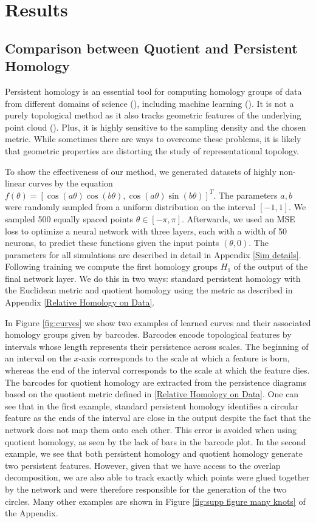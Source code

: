 \documentclass[10pt]{article} %
\theoremstyle{plain}
\theoremstyle{definition}
\theoremstyle{remark}
\begin{document}
\section{Results}
\subsection{Comparison between Quotient and Persistent Homology} 

Persistent homology is an essential tool for computing homology groups of data from different domains of science (\cite{carlsson2009topology, wasserman2018topological}), including machine learning (\cite{papamarkou2024position}). It is not a purely topological method as it also tracks geometric features of the underlying point cloud (\cite{bubenik2020persistent, turkes2022effectiveness}). Plus, it is highly sensitive to the sampling density and the chosen metric. While sometimes there are ways to overcome these problems, it is likely that geometric properties are distorting the study of representational topology.

To show the effectiveness of our method, we generated datasets of highly non-linear curves by the equation $f(\theta) = [\cos(a\theta)\cos(b\theta), \cos(a\theta)\sin(b\theta)]^T$. The parameters $a, b$ were randomly sampled from a uniform distribution on the interval $[-1,1]$. We sampled 500 equally spaced points $\theta \in [-\pi,\pi]$. Afterwards, we used an MSE loss to optimize a neural network with three layers, each with a width of 50 neurons, to predict these functions given the input points $(\theta,0)$. The parameters for all simulations are described in detail in Appendix \ref{Sim details}. Following training we compute the first homology groups $H_1$ of the output of the final network layer. We do this in two ways: standard persistent homology with the Euclidean metric and quotient homology using the metric as described in Appendix \ref{Relative Homology on Data}.

In Figure \ref{fig:curves} we show two examples of learned curves and their associated homology groups given by barcodes. {Barcodes encode topological features by intervals whose length represents their persistence across scales. The beginning of an interval on the $x$-axis corresponds to the scale at which a feature is born, whereas the end of the interval corresponds to the scale at which the feature dies. The barcodes for quotient homology are extracted from the persistence diagrams based on the quotient metric defined in \ref{Relative Homology on Data}.} One can see that in the first example, standard persistent homology identifies a circular feature as the ends of the interval are close in the output despite the fact that the network does not map them onto each other. This error is avoided when using quotient homology, as seen by the lack of bars in the barcode plot. In the second example, we see that both persistent homology and quotient homology generate two persistent features. However, given that we have access to the overlap decomposition, we are also able to track exactly which points were glued together by the network and were therefore responsible for the generation of the two circles. Many other examples are shown in Figure \ref{fig:supp figure many knots} of the Appendix.
\end{document}
